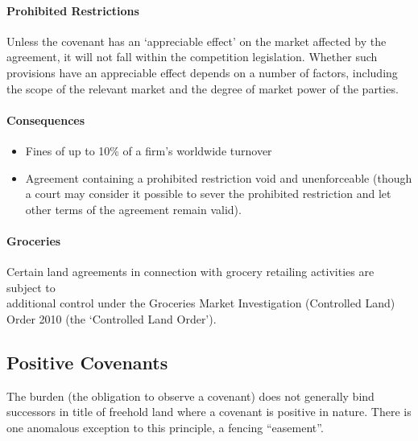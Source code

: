\documentclass[
]{article}
\providecommand{\tightlist}{%
  \setlength{\itemsep}{0pt}\setlength{\parskip}{0pt}}
\begin{document}
\hypertarget{prohibited-restrictions}{%
\paragraph{Prohibited Restrictions}\label{prohibited-restrictions}}

Unless the covenant has an `appreciable effect' on the market affected
by the\\
agreement, it will not fall within the competition legislation. Whether
such provisions have an appreciable effect depends on a number of
factors, including the scope of the relevant market and the degree of
market power of the parties.

\hypertarget{consequences}{%
\paragraph{Consequences}\label{consequences}}

\begin{itemize}
\tightlist
\item
  Fines of up to 10\% of a firm's worldwide turnover
\item
  Agreement containing a prohibited restriction void and unenforceable
  (though a court may consider it possible to sever the prohibited
  restriction and let other terms of the agreement remain valid).
\end{itemize}

\hypertarget{groceries}{%
\paragraph{Groceries}\label{groceries}}

Certain land agreements in connection with grocery retailing activities
are subject to\\
additional control under the Groceries Market Investigation (Controlled
Land) Order 2010 (the `Controlled Land Order').

\hypertarget{positive-covenants}{%
\subsection{Positive Covenants}\label{positive-covenants}}

The burden (the obligation to observe a covenant) does not generally
bind successors in title of freehold land where a covenant is positive
in nature. There is one anomalous exception to this principle, a fencing
``easement''.
\end{document}
